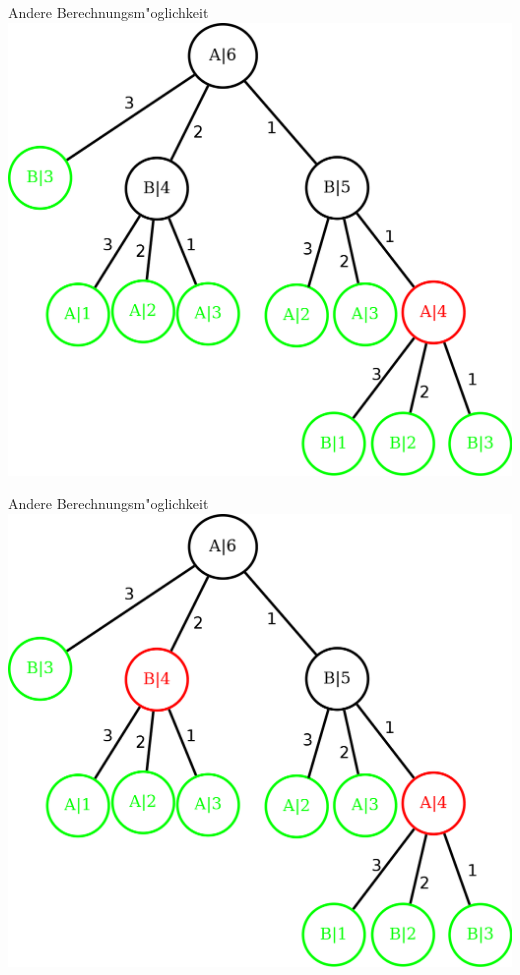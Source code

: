 \documentclass[18pt]{beamer}
\begin{document}
\begin{frame}{Andere Berechnungsm"oglichkeit}
\includegraphics[scale=0.4]{baum5.png}
\end{frame}

\begin{frame}{Andere Berechnungsm"oglichkeit}
\includegraphics[scale=0.4]{baum6.png}
\end{frame}
\end{document}
